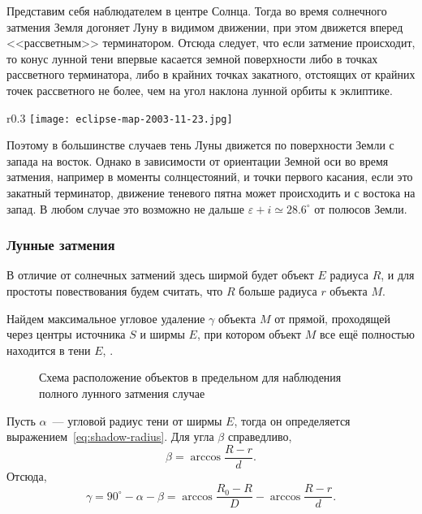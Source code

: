 Представим себя наблюдателем в центре Солнца. Тогда во время солнечного затмения Земля догоняет Луну в видимом движении, при этом движется вперед <<рассветным>> терминатором. Отсюда следует, что если затмение происходит, то конус лунной тени впервые касается земной поверхности либо в точках рассветного терминатора, либо в крайних точках закатного, отстоящих от крайних точек рассветного не более, чем на угол наклона лунной орбиты к эклиптике.

\begin{wrapfigure}[8]{r}{0.3\tw}
    \vspace{-1pc}
    \centering
    \texttt{[image: eclipse-map-2003-11-23.jpg]}
    \caption{}  
    \label{}  
\end{wrapfigure}
Поэтому в большинстве случаев тень Луны движется по поверхности Земли с запада на восток. Однако в зависимости от ориентации Земной оси во время затмения, например в моменты солнцестояний, и точки первого касания, если это закатный терминатор, движение теневого пятна может происходить и с востока на запад. В любом случае это возможно не дальше $\varepsilon + i \simeq 28.6^\circ$ от полюсов Земли.

\subsubsection*{Лунные затмения}
В отличие от солнечных затмений здесь ширмой будет объект $E$ радиуса $R$, и для простоты повествования будем считать, что $R$ больше радиуса $r$ объекта $M$. 

Найдем максимальное угловое удаление $\gamma$ объекта $M$ от прямой, проходящей через центры источника $S$ и ширмы $E$, при котором объект $M$ все ещё полностью находится в тени $E$, .

\begin{figure}[h!]
    \centering
    
    \caption{Схема расположение объектов в предельном для наблюдения полного лунного затмения случае}
    \label{pic:eclipses-full-lunar-eslipse}
\end{figure}

Пусть $\alpha$~--- угловой радиус тени от ширмы $E$, тогда он определяется выражением~\eqref{eq:shadow-radius}. Для угла $\beta$ справедливо,
\begin{equation}
    \beta = \arccos \frac{R - r}{d}.
    \label{eq:eclipses-lunar-beta}
\end{equation}
Отсюда,
\begin{equation*}
    \gamma = 90^\circ - \alpha - \beta = \arccos \frac{R_0 - R}{D} - \arccos \frac{R - r}{d}.
\end{equation*}

